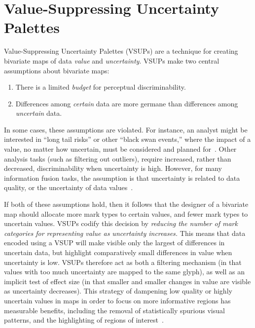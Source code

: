 \section{Value-Suppressing Uncertainty Palettes}


Value-Suppressing Uncertainty Palettes (VSUPs) are a technique for creating bivariate maps of data \emph{value} and \emph{uncertainty}. VSUPs make two central assumptions about bivariate maps:

\begin{enumerate}
	\item There is a limited \emph{budget} for perceptual discriminability.
	\item Differences among \emph{certain} data are more germane than differences among \emph{uncertain} data.
\end{enumerate}

In some cases, these assumptions are violated. For instance, an analyst might be interested in ``long tail risks'' or other ``black swan events,'' where the impact of a value, no matter how uncertain, must be considered and planned for~\cite{taleb2011black}. Other analysis tasks (such as filtering out outliers), require increased, rather than decreased, discriminability when uncertainty is high. However, for many information fusion tasks, the assumption is that uncertainty is related to data quality, or the uncertainty of data values~\cite{riveiro2007evaluation}.

If both of these assumptions hold, then it follows that the designer of a bivariate map should allocate more mark types to certain values, and fewer mark types to uncertain values. VSUPs codify this decision by \emph{reducing the number of mark categories for representing value as uncertainty increases.} This means that data encoded using a VSUP will make visible only the largest of differences in uncertain data, but highlight comparatively small differences in value when uncertainty is low. VSUPs therefore act as both a filtering mechanism (in that values with too much uncertainty are mapped to the same glyph), as well as an implicit test of effect size (in that smaller and smaller changes in value are visible as uncertainty decreases). This strategy of dampening low quality or highly uncertain values in maps in order to focus on more informative regions has measurable benefits, including the removal of statistically spurious visual patterns, and the highlighting of regions of interest~\cite{correll2017surprise}.

